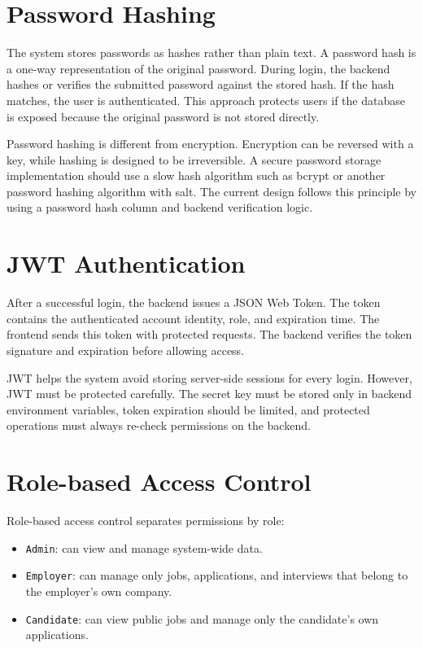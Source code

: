 \documentclass[11pt,a4paper]{report}
\begin{document}
\section{Password Hashing}

The system stores passwords as hashes rather than plain text. A password hash is a one-way representation of the original password. During login, the backend hashes or verifies the submitted password against the stored hash. If the hash matches, the user is authenticated. This approach protects users if the database is exposed because the original password is not stored directly.

Password hashing is different from encryption. Encryption can be reversed with a key, while hashing is designed to be irreversible. A secure password storage implementation should use a slow hash algorithm such as bcrypt or another password hashing algorithm with salt. The current design follows this principle by using a password hash column and backend verification logic.

\section{JWT Authentication}

After a successful login, the backend issues a JSON Web Token. The token contains the authenticated account identity, role, and expiration time. The frontend sends this token with protected requests. The backend verifies the token signature and expiration before allowing access.

JWT helps the system avoid storing server-side sessions for every login. However, JWT must be protected carefully. The secret key must be stored only in backend environment variables, token expiration should be limited, and protected operations must always re-check permissions on the backend.

\section{Role-based Access Control}

Role-based access control separates permissions by role:

\begin{itemize}[leftmargin=1.5cm]
  \item \texttt{Admin}: can view and manage system-wide data.
  \item \texttt{Employer}: can manage only jobs, applications, and interviews that belong to the employer's own company.
  \item \texttt{Candidate}: can view public jobs and manage only the candidate's own applications.
\end{itemize}
\end{document}
